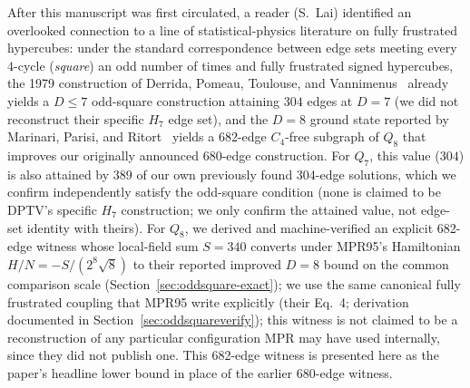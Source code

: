 \documentclass[12pt,a4paper]{article}
\theoremstyle{definition}
\begin{document}
After this manuscript was first circulated, a reader (S.~Lai) identified an
overlooked connection to a line of statistical-physics literature on fully
frustrated hypercubes: under the standard correspondence between edge sets
meeting every $4$-cycle (\emph{square}) an odd number of times and fully
frustrated signed hypercubes, the 1979 construction of Derrida, Pomeau,
Toulouse, and Vannimenus~\cite{DPTV79} already yields a $D\le7$ odd-square
construction attaining $304$ edges at $D=7$ (we did not reconstruct
their specific $H_7$ edge set), and the $D{=}8$ ground state reported by Marinari, Parisi,
and Ritort~\cite{MPR95} yields a 682-edge $C_4$-free subgraph of $Q_8$ that
improves our originally announced 680-edge construction. For $Q_7$, this
value ($304$) is also attained by $389$ of our own previously found 304-edge
solutions, which we confirm independently satisfy the odd-square condition
(none is claimed to be DPTV's specific $H_7$ construction; we only
confirm the attained value, not edge-set identity with theirs). For
$Q_8$, we derived and machine-verified an explicit 682-edge witness
whose local-field sum $S=340$ converts under MPR95's Hamiltonian
$H/N=-S/(2^8\sqrt8)$ to their reported improved $D=8$ bound on the
common comparison scale (Section~\ref{sec:oddsquare-exact}); we use the
same canonical fully frustrated coupling that MPR95 write explicitly (their
Eq.~4; derivation documented in
Section~\ref{sec:oddsquareverify}); this witness is not claimed to be a
reconstruction of any particular configuration MPR may have used
internally, since they did not publish one. This 682-edge
witness is presented here as the paper's headline lower bound in place
of the earlier 680-edge witness.
\end{document}
